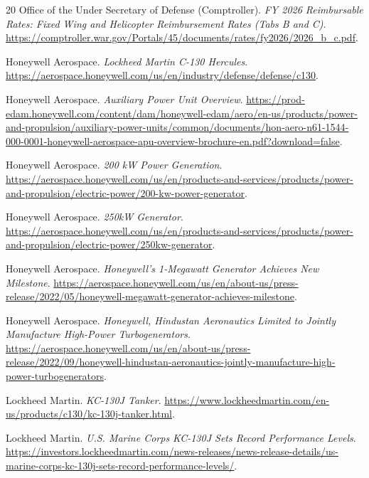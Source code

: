 \documentclass[8pt,twocolumn]{extarticle}
\begin{document}
\begin{thebibliography}{20}
Office of the Under Secretary of Defense (Comptroller).
\newblock \emph{FY 2026 Reimbursable Rates: Fixed Wing and Helicopter Reimbursement Rates (Tabs B and C)}.
\newblock \url{https://comptroller.war.gov/Portals/45/documents/rates/fy2026/2026_b_c.pdf}.

Honeywell Aerospace.
\newblock \emph{Lockheed Martin C-130 Hercules}.
\newblock \url{https://aerospace.honeywell.com/us/en/industry/defense/defense/c130}.

Honeywell Aerospace.
\newblock \emph{Auxiliary Power Unit Overview}.
\newblock \url{https://prod-edam.honeywell.com/content/dam/honeywell-edam/aero/en-us/products/power-and-propulsion/auxiliary-power-units/common/documents/hon-aero-n61-1544-000-0001-honeywell-aerospace-apu-overview-brochure-en.pdf?download=false}.

Honeywell Aerospace.
\newblock \emph{200 kW Power Generation}.
\newblock \url{https://aerospace.honeywell.com/us/en/products-and-services/products/power-and-propulsion/electric-power/200-kw-power-generator}.

Honeywell Aerospace.
\newblock \emph{250kW Generator}.
\newblock \url{https://aerospace.honeywell.com/us/en/products-and-services/products/power-and-propulsion/electric-power/250kw-generator}.

Honeywell Aerospace.
\newblock \emph{Honeywell's 1-Megawatt Generator Achieves New Milestone}.
\newblock \url{https://aerospace.honeywell.com/us/en/about-us/press-release/2022/05/honeywell-megawatt-generator-achieves-milestone}.

Honeywell Aerospace.
\newblock \emph{Honeywell, Hindustan Aeronautics Limited to Jointly Manufacture High-Power Turbogenerators}.
\newblock \url{https://aerospace.honeywell.com/us/en/about-us/press-release/2022/09/honeywell-hindustan-aeronautics-jointly-manufacture-high-power-turbogenerators}.

Lockheed Martin.
\newblock \emph{KC-130J Tanker}.
\newblock \url{https://www.lockheedmartin.com/en-us/products/c130/kc-130j-tanker.html}.

Lockheed Martin.
\newblock \emph{U.S. Marine Corps KC-130J Sets Record Performance Levels}.
\newblock \url{https://investors.lockheedmartin.com/news-releases/news-release-details/us-marine-corps-kc-130j-sets-record-performance-levels/}.


\end{thebibliography}
\end{document}
